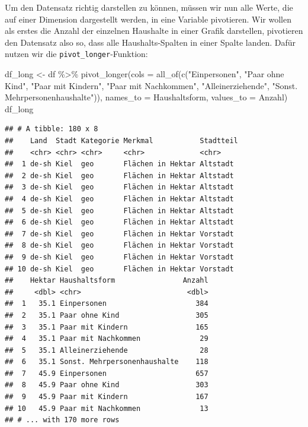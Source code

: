 \documentclass[
]{book}
\newenvironment{Shaded}{\begin{snugshade}}{\end{snugshade}}
\newcommand{\AttributeTok}[1]{\textcolor[rgb]{0.77,0.63,0.00}{#1}}
\newcommand{\FunctionTok}[1]{\textcolor[rgb]{0.00,0.00,0.00}{#1}}
\newcommand{\NormalTok}[1]{#1}
\newcommand{\OtherTok}[1]{\textcolor[rgb]{0.56,0.35,0.01}{#1}}
\newcommand{\SpecialCharTok}[1]{\textcolor[rgb]{0.00,0.00,0.00}{#1}}
\newcommand{\StringTok}[1]{\textcolor[rgb]{0.31,0.60,0.02}{#1}}
\begin{document}
Um den Datensatz richtig darstellen zu können, müssen wir nun alle Werte, die auf einer Dimension dargestellt werden, in eine Variable pivotieren. Wir wollen als erstes die Anzahl der einzelnen Haushalte in einer Grafik darstellen, pivotieren den Datensatz also so, dass alle Haushalts-Spalten in einer Spalte landen. Dafür nutzen wir die \texttt{pivot\_longer}-Funktion:

\begin{Shaded}
\begin{Highlighting}[]
\NormalTok{df\_long }\OtherTok{\textless{}{-}}\NormalTok{ df }\SpecialCharTok{\%\textgreater{}\%} 
  \FunctionTok{pivot\_longer}\NormalTok{(}\AttributeTok{cols =} \FunctionTok{all\_of}\NormalTok{(}\FunctionTok{c}\NormalTok{(}\StringTok{"Einpersonen"}\NormalTok{, }
                               \StringTok{"Paar ohne Kind"}\NormalTok{, }
                               \StringTok{"Paar mit Kindern"}\NormalTok{, }
                               \StringTok{"Paar mit Nachkommen"}\NormalTok{,}
                               \StringTok{"Alleinerziehende"}\NormalTok{, }
                               \StringTok{"Sonst. Mehrpersonenhaushalte"}\NormalTok{)),}
               \AttributeTok{names\_to =} \StringTok{\textquotesingle{}Haushaltsform\textquotesingle{}}\NormalTok{,}
               \AttributeTok{values\_to =} \StringTok{\textquotesingle{}Anzahl\textquotesingle{}}\NormalTok{)}
\NormalTok{df\_long}
\end{Highlighting}
\end{Shaded}

\begin{verbatim}
## # A tibble: 180 x 8
##    Land  Stadt Kategorie Merkmal           Stadtteil
##    <chr> <chr> <chr>     <chr>             <chr>    
##  1 de-sh Kiel  geo       Flächen in Hektar Altstadt 
##  2 de-sh Kiel  geo       Flächen in Hektar Altstadt 
##  3 de-sh Kiel  geo       Flächen in Hektar Altstadt 
##  4 de-sh Kiel  geo       Flächen in Hektar Altstadt 
##  5 de-sh Kiel  geo       Flächen in Hektar Altstadt 
##  6 de-sh Kiel  geo       Flächen in Hektar Altstadt 
##  7 de-sh Kiel  geo       Flächen in Hektar Vorstadt 
##  8 de-sh Kiel  geo       Flächen in Hektar Vorstadt 
##  9 de-sh Kiel  geo       Flächen in Hektar Vorstadt 
## 10 de-sh Kiel  geo       Flächen in Hektar Vorstadt 
##    Hektar Haushaltsform                Anzahl
##     <dbl> <chr>                         <dbl>
##  1   35.1 Einpersonen                     384
##  2   35.1 Paar ohne Kind                  305
##  3   35.1 Paar mit Kindern                165
##  4   35.1 Paar mit Nachkommen              29
##  5   35.1 Alleinerziehende                 28
##  6   35.1 Sonst. Mehrpersonenhaushalte    118
##  7   45.9 Einpersonen                     657
##  8   45.9 Paar ohne Kind                  303
##  9   45.9 Paar mit Kindern                167
## 10   45.9 Paar mit Nachkommen              13
## # ... with 170 more rows
\end{verbatim}
\end{document}
